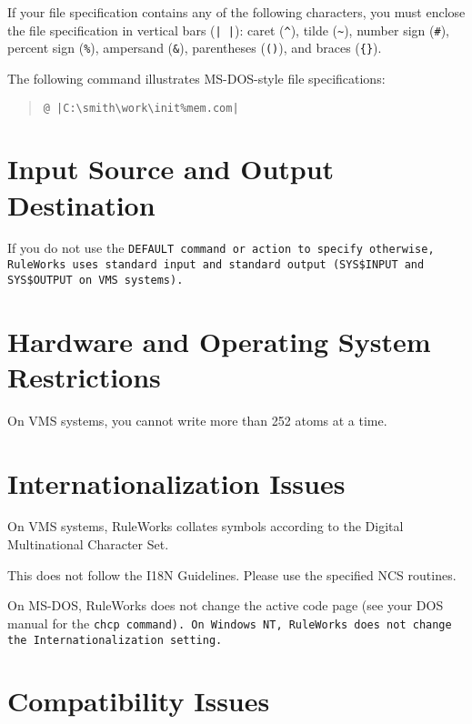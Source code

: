 If your file specification contains any of the following characters,
you must enclose the file specification in vertical bars (\verb,| |,):
caret (\verb|^|), tilde (\verb|~|), number sign (\verb|#|), percent
sign (\verb|%|), ampersand (\verb|&|), parentheses (\verb|()|), and
braces (\verb|{}|).

The following command illustrates MS-DOS-style file specifications:

\begin{quote}
\begin{verbatim}
@ |C:\smith\work\init%mem.com|
\end{verbatim}
\end{quote}

\section{Input Source and Output Destination}

If you do not use the \tt{DEFAULT} command or action to specify
otherwise, RuleWorks uses standard input and standard output
(\verb|SYS$INPUT| and \verb|SYS$OUTPUT| on VMS systems).

\section{Hardware and Operating System Restrictions}

On VMS systems, you cannot write more than 252 atoms at a time.

\section{Internationalization Issues}

On VMS systems, RuleWorks collates symbols according to the Digital
Multinational Character Set.

This does not follow the I18N Guidelines. Please use the specified NCS
routines.

On MS-DOS, RuleWorks does not change the active code page (see your
DOS manual for the \tt{chcp} command). On Windows NT, RuleWorks does not
change the Internationalization setting.

\section{Compatibility Issues}

